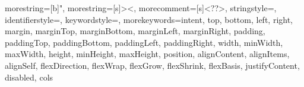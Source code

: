 \usepackage{listings}

\usepackage{color}


{
  morestring=[b]",
  morestring=[s]{>}{<},
  morecomment=[s]{<?}{?>},
  stringstyle=\color{string},
  identifierstyle=\color{darkblue},
  keywordstyle=\color{cyan},
  morekeywords={intent, top, bottom, left, right, margin, marginTop, marginBottom, marginLeft, marginRight, padding, paddingTop, paddingBottom, paddingLeft, paddingRight, width, minWidth, maxWidth, height, minHeight, maxHeight, position, alignContent, alignItems, alignSelf, flexDirection, flexWrap, flexGrow, flexShrink, flexBasis, justifyContent, disabled, cols}
}
